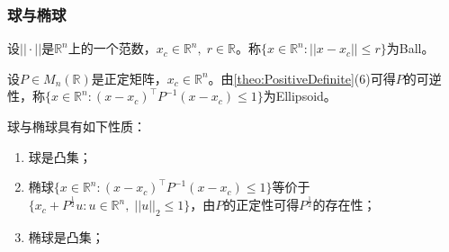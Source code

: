 \subsubsection{球与椭球}
\begin{definition}
	设$||\cdot||$是$\mathbb{R}^{n}$上的一个范数，$x_c\in\mathbb{R}^{n},\;r\in\mathbb{R}$。称$\{x\in\mathbb{R}^{n}:||x-x_c||\leqslant r\}$为\gls{Ball}。
\end{definition}
\begin{definition}
	设$P\in M_{n}(\mathbb{R})$是正定矩阵，$x_c\in\mathbb{R}^{n}$。由\cref{theo:PositiveDefinite}(6)可得$P$的可逆性，称$\{x\in\mathbb{R}^{n}:(x-x_c)^{\top}P^{-1}(x-x_c)\leqslant1\}$为\gls{Ellipsoid}。
\end{definition}
\begin{property}
	球与椭球具有如下性质：
	\begin{enumerate}
		\item 球是凸集；
		\item 椭球$\{x\in\mathbb{R}^{n}:(x-x_c)^{\top}P^{-1}(x-x_c)\leqslant1\}$等价于$\{x_c+P^{\frac{1}{2}}u:u\in\mathbb{R}^{n},\;||u||_2\leqslant1\}$，由$P$的正定性可得$P^{\frac{1}{2}}$的存在性；
		\item 椭球是凸集；
	\end{enumerate}
\end{property}
